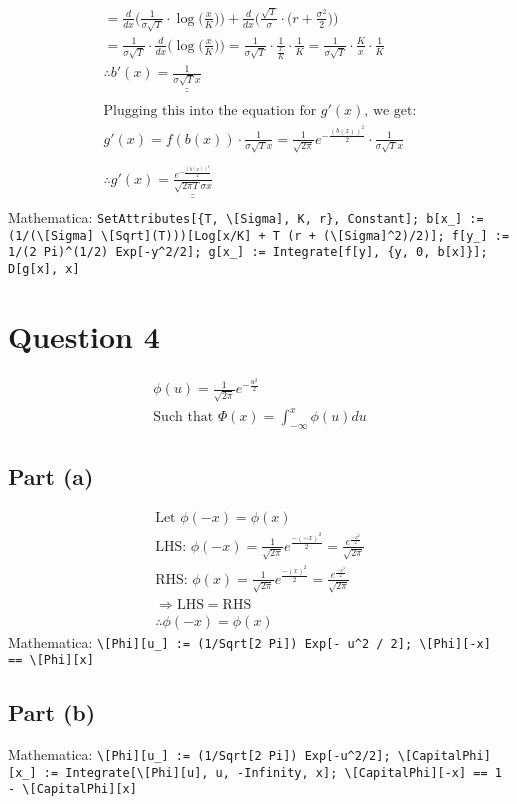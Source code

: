 \documentclass[letterpaper,10pt]{article}
\newcommand{\doubleu}[1]{\underline{\underline{#1}}}
\newcommand{\ddx}[1]{\frac{d}{dx} \bigg( #1 \bigg)}
\newcommand{\mathematica}[1]{Mathematica: \texttt{#1}}
\begin{document}
\begin{gather*}
			= \ddx{\frac{1}{\sigma\sqrt{T}} \cdot \log \Big(\frac{x}{K}\Big)} + \ddx{\frac{\sqrt{T}}{\sigma} \cdot \bigg( r + \frac{\sigma^2}{2} \bigg) } \\
			= \frac{1}{\sigma\sqrt{T}} \cdot \ddx{\log \Big(\frac{x}{K}\Big)} = \frac{1}{\sigma\sqrt{T}} \cdot \frac{1}{\frac{x}{K}} \cdot \frac{1}{K} = \frac{1}{\sigma\sqrt{T}} \cdot \frac{K}{x} \cdot \frac{1}{K} \\
			\therefore b\prime(x) = \doubleu{\frac{1}{\sigma\sqrt{T}x}} \\ \\
			\text{Plugging this into the equation for } g\prime(x) \text{, we get:} \\
			g\prime(x) = f(b(x)) \cdot \frac{1}{\sigma\sqrt{T}x}
			= \frac{1}{\sqrt{2\pi}} e^{-\frac{(b(x))^2}{2}} \cdot \frac{1}{\sigma\sqrt{T}x} \\ \\
			\therefore g\prime(x) = \doubleu{\frac{e^{-\frac{(b(x))^2}{2}}}{\sqrt{2 \pi T}\sigma x}} \\
		\end{gather*}
		\mathematica{SetAttributes[\{T, \textbackslash[Sigma], K, r\}, Constant]; b[x\_] := (1/(\textbackslash[Sigma] \textbackslash[Sqrt](T)))[Log[x/K] + T (r + (\textbackslash[Sigma]\^{}2)/2)]; f[y\_] := 1/(2 Pi)\^{}(1/2) Exp[-y\^{}2/2]; g[x\_] := Integrate[f[y], \{y, 0, b[x]\}]; D[g[x], x]}

	\section{Question 4}
		\begin{gather*}
			\phi(u)=\frac{1}{\sqrt{2\pi}} e^{-\frac{u^2}{2}} \\
			\text{Such that } \Phi(x) = \int_{-\infty}^{x} \phi(u) du
		\end{gather*}

		\subsection{Part (a)}
			\begin{gather*}
				\text{Let } \phi(-x) = \phi(x) \\
				\text{LHS: } \phi(-x) = \frac{1}{\sqrt{2\pi}} e^{\frac{-(-x)^2}{2}}
				= \frac{e^{\frac{-x^2}{2}}}{\sqrt{2\pi}} \\
				\text{RHS: } \phi(x) = \frac{1}{\sqrt{2\pi}} e^{\frac{-(x)^2}{2}}
				= \frac{e^{\frac{-x^2}{2}}}{\sqrt{2\pi}} \\
				\Rightarrow \text{LHS} = \text{RHS} \\
				\therefore \phi(-x) = \phi(x)
			\end{gather*}
			\mathematica{\textbackslash[Phi][u\_] := (1/Sqrt[2 Pi]) Exp[- u\^{}2 / 2]; \textbackslash[Phi][-x] == \textbackslash[Phi][x]}

		\subsection{Part (b)}
			\mathematica{\textbackslash[Phi][u\_] := (1/Sqrt[2 Pi]) Exp[-u\^{}2/2]; \textbackslash[CapitalPhi][x\_] := Integrate[\textbackslash[Phi][u], {u, -Infinity, x}]; \textbackslash[CapitalPhi][-x] == 1 - \textbackslash[CapitalPhi][x]}
\end{document}
